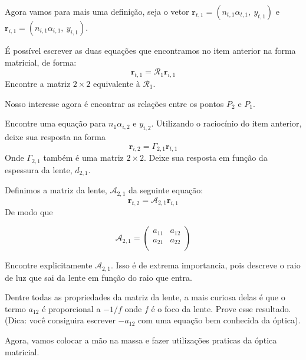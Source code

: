 \documentclass[11pt]{article}
\begin{document}
\begin{pproblem}
\begin{alternativas}
        Agora vamos para mais uma definição, seja o vetor \(\mathbf{r}_{t,1}= (n_{t,1}\alpha_{t,1}, \ y_{t,1})\) e \(\mathbf{r}_{i,1}= (n_{i,1}\alpha_{i,1}, \ y_{i,1})\).
        
            \item É possível escrever as duas equações que encontramos no item anterior na forma matricial, de forma:
            \[\mathbf{r}_{t,1}=\mathcal{R}_1\mathbf{r}_{i,1}\]
            Encontre a matriz \(2\times 2\) equivalente à \(\mathcal{R}_1\).

        Nosso interesse agora é encontrar as relações entre os pontos \(P_2\) e \(P_1\).

            \item Encontre uma equação para \(n_1\alpha_{i,2}\) e \(y_{i,2}\). Utilizando o raciocínio do item anterior, deixe sua resposta na forma
            \[\mathbf{r}_{i,2}=\Gamma_{2,1}\mathbf{r}_{t,1}\]
            Onde \(\Gamma_{2,1}\) também é uma matriz \(2\times 2\). Deixe sua resposta em função da espessura da lente, \(d_{2,1}\).

            \item Definimos a matriz da lente, \(\mathcal{A}_{2,1}\) da seguinte equação:
            \[\mathbf{r}_{t,2} = \mathcal{A}_{2,1}\mathbf{r}_{i,1}\]
            De modo que

            \[\mathcal{A}_{2,1} = \begin{pmatrix}
                a_{11} & a_{12} \\
                a_{21} & a_{22} \\
            \end{pmatrix}\]

            Encontre explicitamente \(\mathcal{A}_{2,1}\). Isso é de extrema importancia, pois descreve o raio de luz que sai da lente em função do raio que entra.

            \item Dentre todas as propriedades da matriz da lente, a mais curiosa delas é que o termo \(a_{12}\) é proporcional a \(-1/f\) onde \(f\) é o foco da lente. Prove esse resultado. (Dica: você consiguira escrever \(-a_{12}\) com uma equação bem conhecida da óptica).
        
        Agora, vamos colocar a mão na massa e fazer utilizações praticas da óptica matricial.
        

\end{alternativas}
\end{pproblem}
\end{document}
